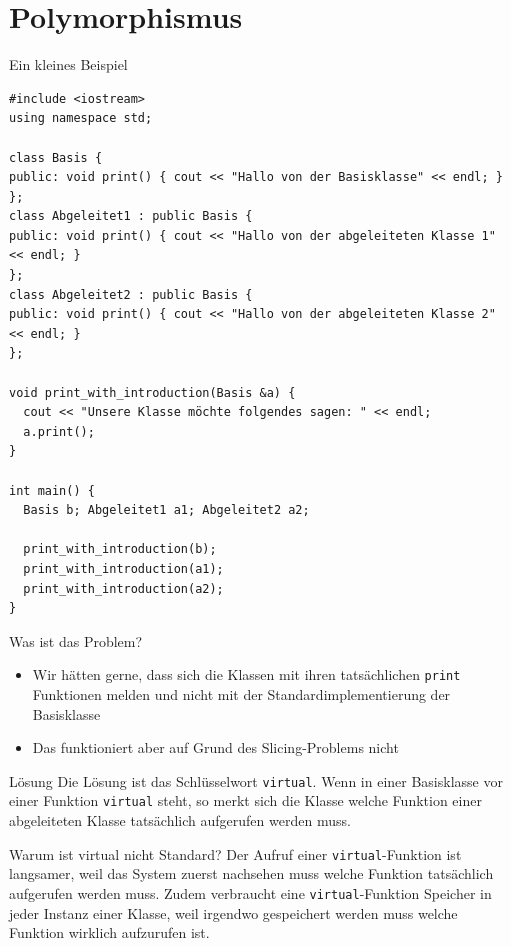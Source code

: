 \documentclass[presentation]{beamer}
\begin{document}
\section{Polymorphismus}
\label{sec:org63e62ae}
\begin{frame}[label={sec:org3b2370c},fragile]{Ein kleines Beispiel}
 \begin{verbatim}
#include <iostream>
using namespace std;

class Basis {
public: void print() { cout << "Hallo von der Basisklasse" << endl; }
};
class Abgeleitet1 : public Basis {
public: void print() { cout << "Hallo von der abgeleiteten Klasse 1" << endl; }
};
class Abgeleitet2 : public Basis {
public: void print() { cout << "Hallo von der abgeleiteten Klasse 2" << endl; }
};

void print_with_introduction(Basis &a) {
  cout << "Unsere Klasse möchte folgendes sagen: " << endl;
  a.print();
}

int main() {
  Basis b; Abgeleitet1 a1; Abgeleitet2 a2;

  print_with_introduction(b);
  print_with_introduction(a1);
  print_with_introduction(a2);
}
\end{verbatim}
\end{frame}
\begin{frame}[label={sec:org289cfb0},fragile]{Was ist das Problem?}
 \begin{itemize}
\item Wir hätten gerne, dass sich die Klassen mit ihren tatsächlichen
{\color{solarizedYellow}\verb!print!} Funktionen melden und nicht mit der Standardimplementierung
der Basisklasse
\item Das funktioniert aber auf Grund des Slicing-Problems nicht
\end{itemize}
\begin{block}{Lösung}
Die Lösung ist das Schlüsselwort {\color{solarizedYellow}\verb!virtual!}. Wenn in einer Basisklasse
vor einer Funktion {\color{solarizedYellow}\verb!virtual!} steht, so merkt sich die Klasse welche
Funktion einer abgeleiteten Klasse tatsächlich aufgerufen werden muss.
\end{block}
\begin{block}{Warum ist virtual nicht Standard?}
Der Aufruf einer {\color{solarizedYellow}\verb!virtual!}-Funktion ist langsamer, weil das System
zuerst nachsehen muss welche Funktion tatsächlich aufgerufen werden
muss. Zudem verbraucht eine {\color{solarizedYellow}\verb!virtual!}-Funktion Speicher in jeder
Instanz einer Klasse, weil irgendwo gespeichert werden muss welche
Funktion wirklich aufzurufen ist.
\end{block}
\end{frame}
\end{document}
